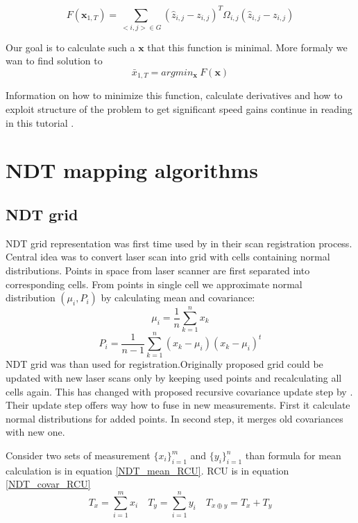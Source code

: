 \begin{equation}
F(\textbf{x}_{1,T}) = \sum_{<i,j>\in G}^{} (\hat{z}_{i,j} - z_{i,j})^{T} \Omega_{i,j} (\hat{z}_{i,j} - z_{i,j}) 
\end{equation}

Our goal is to calculate such a $\textbf{x}$ that this function is minimal. More formaly we wan to find solution to
\begin{equation}
\bar{x}_{1,T} = argmin_{\textbf{x}} \ F(\textbf{x})
\end{equation}

 Information on how to minimize this function, calculate derivatives and how to exploit structure of the problem to get significant speed gains continue in reading in this tutorial \cite{GraphTutorial}.

\newpage


\section{NDT mapping algorithms}
\label{sec:map_alg}
\subsection{NDT grid}
\label{subsec:NDT_grid}
\gls{NDT} grid representation was first time used by \cite{Biber03} in their scan registration process. Central idea was to convert laser scan into grid with cells containing normal distributions. Points in space from laser scanner are first separated into corresponding cells. From points in single cell we approximate normal distribution $(\mu_{i},P_{i})$ by calculating mean and covariance:
\begin{equation}
\mu_{i} = \dfrac{1}{n}\sum_{k=1}^{n}x_{k}
\end{equation}  
\begin{equation}
P_{i} = \dfrac{1}{n-1}\sum_{k=1}^{n}(x_{k}-\mu_{i})(x_{k}-\mu_{i})^{t}
\end{equation} 
\gls{NDT} grid was than used for registration.Originally proposed grid could be updated with new laser scans only by keeping used points and recalculating all cells again. This has changed with proposed recursive covariance update step by \cite{Saarinen13}. Their update step offers way how to fuse in new measurements. First it calculate normal distributions for added points. In second step, it merges old covariances with new one.

Consider two sets of measurement $\{x_{i}\}^{m}_{i=1}$ and $\{y_{i}\}^{n}_{i=1}$ than formula for mean calculation is in equation \eqref{NDT_mean_RCU}. \gls{RCU} is in equation \eqref{NDT_covar_RCU}
\begin{equation}
T_{x} = \sum_{i =1}^{m}x_{i} \quad
T_{y} = \sum_{i =1}^{n}y_{i} \quad
T_{x\oplus y} = T_{x} + T_{y} 
\end{equation}

